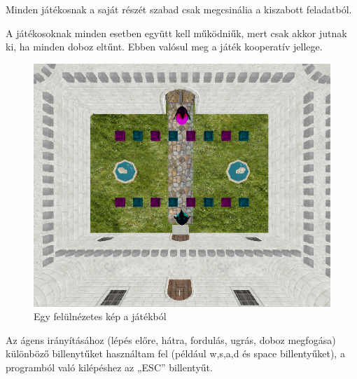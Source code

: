 Minden játékosnak a saját részét szabad csak megcsinália a kiszabott feladatból. 

A játékosoknak minden esetben együtt kell működniűk, mert csak akkor jutnak ki, ha minden doboz eltűnt. Ebben valósul meg a játék kooperatív jellege. 

\begin{figure}[htp]
    \centering
   	\includegraphics[scale=0.7]{images/game.png}
	\caption{Egy felülnézetes kép a játékból}
	\label{fig:game}
\end{figure}



Az ágens irányításához (lépés előre, hátra, fordulás, ugrás, doboz megfogása) különböző billenytűket használtam fel (például w,s,a,d és space billentyűket), a  programból való kilépéshez az „ESC” billentyűt. 

